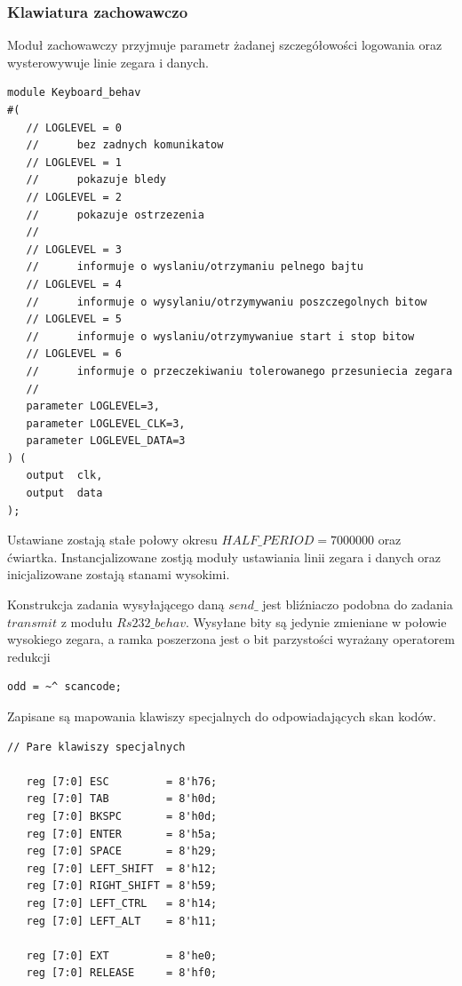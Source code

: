 \documentclass[a4paper,12pt]{article}
\begin{document}
\subsubsection{Klawiatura zachowawczo}

Moduł zachowawczy przyjmuje parametr żadanej szczegółowości logowania oraz wysterowywuje linie zegara i danych.

\begin{lstlisting}[label=Keyboard_behav,caption=Keyboard\_behav.v]
module Keyboard_behav
#(
   // LOGLEVEL = 0
   //      bez zadnych komunikatow
   // LOGLEVEL = 1
   //      pokazuje bledy
   // LOGLEVEL = 2
   //      pokazuje ostrzezenia
   //
   // LOGLEVEL = 3
   //      informuje o wyslaniu/otrzymaniu pelnego bajtu
   // LOGLEVEL = 4
   //      informuje o wysylaniu/otrzymywaniu poszczegolnych bitow
   // LOGLEVEL = 5
   //      informuje o wyslaniu/otrzymywaniue start i stop bitow
   // LOGLEVEL = 6
   //      informuje o przeczekiwaniu tolerowanego przesuniecia zegara
   //
   parameter LOGLEVEL=3,
   parameter LOGLEVEL_CLK=3,
   parameter LOGLEVEL_DATA=3
) (
   output  clk,
   output  data
);
\end{lstlisting}

Ustawiane zostają stałe połowy okresu $HALF\_PERIOD = 7 000 000$ oraz ćwiartka. Instancjalizowane zostją moduły ustawiania linii zegara i danych oraz inicjalizowane zostają stanami wysokimi.

Konstrukcja zadania wysyłającego daną $send\_$ jest bliźniaczo podobna do zadania $transmit$ z modułu $Rs232\_behav$. Wysyłane bity są jedynie zmieniane w połowie wysokiego zegara, a ramka poszerzona jest o bit parzystości wyrażany operatorem redukcji
\begin{lstlisting}[label=Keyboard_behav,caption=Keyboard\_behav.v,firstnumber=75]
	 odd = ~^ scancode;
\end{lstlisting}

Zapisane są mapowania klawiszy specjalnych do odpowiadających skan kodów.
\begin{lstlisting}[label=Keyboard_behav,caption=Keyboard\_behav.v,firstnumber=110]
   // Pare klawiszy specjalnych

   reg [7:0] ESC         = 8'h76;
   reg [7:0] TAB         = 8'h0d;
   reg [7:0] BKSPC       = 8'h0d;
   reg [7:0] ENTER       = 8'h5a;
   reg [7:0] SPACE       = 8'h29;
   reg [7:0] LEFT_SHIFT  = 8'h12;
   reg [7:0] RIGHT_SHIFT = 8'h59;
   reg [7:0] LEFT_CTRL   = 8'h14;
   reg [7:0] LEFT_ALT    = 8'h11;

   reg [7:0] EXT         = 8'he0;
   reg [7:0] RELEASE     = 8'hf0;
\end{lstlisting}
\end{document}

